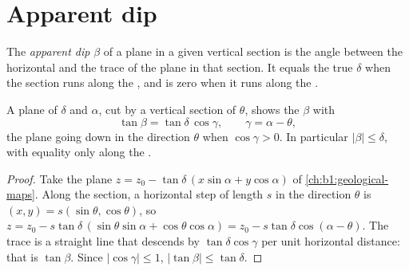 \section{Apparent dip}\label{sec:b1:cross-sections:apparent}

\begin{definition}\label{def:b1:cross-sections:apparent-dip}
The \emph{apparent dip} $\beta$ of a plane in a given
vertical section is the angle between the horizontal and the trace of the
plane in that section. It equals the true  $\delta$ when the section runs
along the , and is zero when it runs along the .
\end{definition}

\begin{theorem}\label{thm:b1:cross-sections:apparent-dip}
A plane of  $\delta$ and  $\alpha$, cut by a vertical
section of  $\theta$, shows the  $\beta$ with
\[
  \tan\beta = \tan\delta\,\cos\gamma, \qquad \gamma = \alpha - \theta ,
\]
the plane going down in the direction $\theta$ when $\cos\gamma > 0$.
In particular $|\beta| \le \delta$, with equality only along the .
\end{theorem}

\begin{proof}
Take the plane $z = z_0 - \tan\delta\,(x\sin\alpha + y\cos\alpha)$ of
\cref{ch:b1:geological-maps}. Along the section, a horizontal step of length
$s$ in the direction $\theta$ is $(x, y) = s(\sin\theta, \cos\theta)$, so
$z = z_0 - s\tan\delta\,(\sin\theta\sin\alpha + \cos\theta\cos\alpha) =
z_0 - s\tan\delta\cos(\alpha - \theta)$. The trace is a straight line that
descends by $\tan\delta\cos\gamma$ per unit horizontal distance: that is
$\tan\beta$. Since $|\cos\gamma| \le 1$, $|\tan\beta| \le \tan\delta$.
\end{proof}

